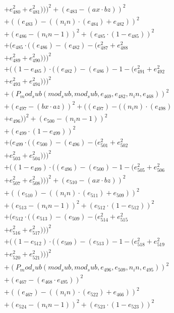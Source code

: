 \documentclass[10pt, a4paper]{article}
\begin{document}
\begin{small}
\begin{align*}
& + e_{480}^{2} + e_{481}^{2})))^{2} + (e_{483} - (ax  \cdot  bz))^{2} \\
& + ((e_{483}) - ((n_in)  \cdot  (e_{484}) + e_{482}))^{2} \\
& + (e_{486} - (n_in - 1))^{2} + (e_{485}  \cdot  (1 - e_{485}))^{2} \\
& + (e_{485}  \cdot  ((e_{486}) - (e_{482}) - (e_{487}^{2} + e_{488}^{2} \\
& + e_{489}^{2} + e_{490}^{2})))^{2} \\
& + ((1 - e_{485})  \cdot  ((e_{482}) - (e_{486}) - 1 - (e_{491}^{2} + e_{492}^{2} \\
& + e_{493}^{2} + e_{494}^{2})))^{2} \\
& + (P_mod_sub(mod_sub, mod_sub, e_{469}, e_{482}, n_in, e_{468}))^{2} \\
& + (e_{497} - (bx  \cdot  az))^{2} + ((e_{497}) - ((n_in)  \cdot  (e_{498}) \\
& + e_{496}))^{2} + (e_{500} - (n_in - 1))^{2} \\
& + (e_{499}  \cdot  (1 - e_{499}))^{2} \\
& + (e_{499}  \cdot  ((e_{500}) - (e_{496}) - (e_{501}^{2} + e_{502}^{2} \\
& + e_{503}^{2} + e_{504}^{2})))^{2} \\
& + ((1 - e_{499})  \cdot  ((e_{496}) - (e_{500}) - 1 - (e_{505}^{2} + e_{506}^{2} \\
& + e_{507}^{2} + e_{508}^{2})))^{2} + (e_{510} - (ax  \cdot  bz))^{2} \\
& + ((e_{510}) - ((n_in)  \cdot  (e_{511}) + e_{509}))^{2} \\
& + (e_{513} - (n_in - 1))^{2} + (e_{512}  \cdot  (1 - e_{512}))^{2} \\
& + (e_{512}  \cdot  ((e_{513}) - (e_{509}) - (e_{514}^{2} + e_{515}^{2} \\
& + e_{516}^{2} + e_{517}^{2})))^{2} \\
& + ((1 - e_{512})  \cdot  ((e_{509}) - (e_{513}) - 1 - (e_{518}^{2} + e_{519}^{2} \\
& + e_{520}^{2} + e_{521}^{2})))^{2} \\
& + (P_mod_sub(mod_sub, mod_sub, e_{496}, e_{509}, n_in, e_{495}))^{2} \\
& + (e_{467} - (e_{468}  \cdot  e_{495}))^{2} \\
& + ((e_{467}) - ((n_in)  \cdot  (e_{522}) + e_{466}))^{2} \\
& + (e_{524} - (n_in - 1))^{2} + (e_{523}  \cdot  (1 - e_{523}))^{2} \\

\end{align*}
\end{small}
\end{document}
